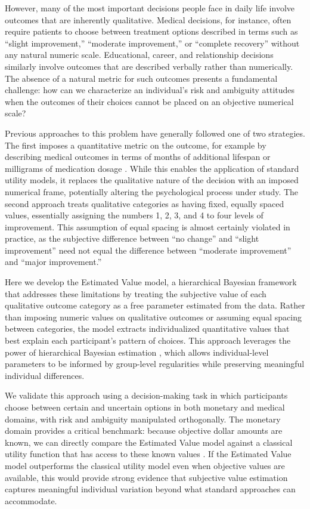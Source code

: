 \documentclass[12pt]{article}
\begin{document}
However, many of the most important decisions people face in daily life involve outcomes that are inherently qualitative. Medical decisions, for instance, often require patients to choose between treatment options described in terms such as ``slight improvement,'' ``moderate improvement,'' or ``complete recovery'' without any natural numeric scale. Educational, career, and relationship decisions similarly involve outcomes that are described verbally rather than numerically. The absence of a natural metric for such outcomes presents a fundamental challenge: how can we characterize an individual's risk and ambiguity attitudes when the outcomes of their choices cannot be placed on an objective numerical scale?

Previous approaches to this problem have generally followed one of two strategies. The first imposes a quantitative metric on the outcome, for example by describing medical outcomes in terms of months of additional lifespan or milligrams of medication dosage \citep{wakker2010prospect}. While this enables the application of standard utility models, it replaces the qualitative nature of the decision with an imposed numerical frame, potentially altering the psychological process under study. The second approach treats qualitative categories as having fixed, equally spaced values, essentially assigning the numbers 1, 2, 3, and 4 to four levels of improvement. This assumption of equal spacing is almost certainly violated in practice, as the subjective difference between ``no change'' and ``slight improvement'' need not equal the difference between ``moderate improvement'' and ``major improvement.''

Here we develop the Estimated Value model, a hierarchical Bayesian framework that addresses these limitations by treating the subjective value of each qualitative outcome category as a free parameter estimated from the data. Rather than imposing numeric values on qualitative outcomes or assuming equal spacing between categories, the model extracts individualized quantitative values that best explain each participant's pattern of choices. This approach leverages the power of hierarchical Bayesian estimation \citep{gelman2013bayesian, kruschke2018bayesian}, which allows individual-level parameters to be informed by group-level regularities while preserving meaningful individual differences.

We validate this approach using a decision-making task in which participants choose between certain and uncertain options in both monetary and medical domains, with risk and ambiguity manipulated orthogonally. The monetary domain provides a critical benchmark: because objective dollar amounts are known, we can directly compare the Estimated Value model against a classical utility function that has access to these known values \citep{levy2010neural, tymula2012ambiguity}. If the Estimated Value model outperforms the classical utility model even when objective values are available, this would provide strong evidence that subjective value estimation captures meaningful individual variation beyond what standard approaches can accommodate.
\end{document}
